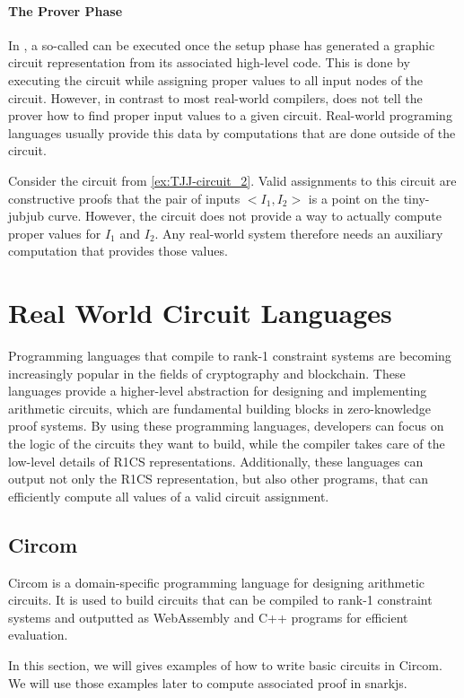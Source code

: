 \paragraph{The Prover Phase} In , a so-called  can be executed once the setup phase has generated a graphic circuit representation from its associated high-level code. This is done by executing the circuit while assigning proper values to all input nodes of the circuit. However, in contrast to most real-world compilers,  does not tell the prover how to find proper input values to a given circuit. Real-world programing languages usually provide this data by computations that are done outside of the circuit.
\begin{example} Consider the circuit from \examplename{} \ref{ex:TJJ-circuit_2}. Valid assignments to this circuit are constructive proofs that the pair of inputs $<I_1,I_2>$ is a point on the tiny-jubjub curve. However, the circuit does not provide a way to actually compute proper values for $I_1$ and $I_2$. Any real-world system therefore needs an auxiliary computation that provides those values.
\end{example}
\section{Real World Circuit Languages}
Programming languages that compile to rank-1 constraint systems are becoming increasingly popular in the fields of cryptography and blockchain. These languages provide a higher-level abstraction for designing and implementing arithmetic circuits, which are fundamental building blocks in zero-knowledge proof systems. By using these programming languages, developers can focus on the logic of the circuits they want to build, while the compiler takes care of the low-level details of R1CS representations. Additionally, these languages can output not only the R1CS representation, but also other programs, that can efficiently compute all values of a valid circuit assignment. 

\subsection{Circom}
Circom is a domain-specific programming language for designing arithmetic circuits. It is used to build circuits that can be compiled to rank-1 constraint systems and outputted as WebAssembly and C++ programs for efficient evaluation.

In this section, we will gives examples of how to write basic circuits in Circom. We will use those examples later to compute associated proof in snarkjs. 

